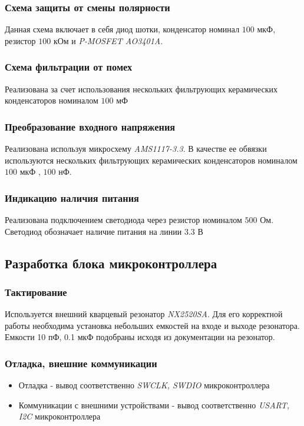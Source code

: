 \subsubsection{Схема защиты от смены полярности}
Данная схема\cite{schemt} включает в себя диод шотки, конденсатор номинал $100$ мкФ, резистор $100$ кОм и \textit{P-MOSFET AO3401A}.

\subsubsection{Схема фильтрации от помех}
Реализована за счет использования нескольких фильтрующих керамических конденсаторов номиналом $100$ мФ

\subsubsection{Преобразование входного напряжения}
Реализована используя микросхему \textit{AMS1117-3.3}. В качестве ее обвязки\cite{ams1117_datasheet} используются нескольких фильтрующих керамических конденсаторов номиналом $100$ мкФ , $100$ нФ.

\subsubsection{Индикацию наличия питания}
Реализована подключением светодиода через резистор номиналом $500$ Ом. Светодиод обозначает наличие питания на линии 3.3 В

\subsection{Разработка блока микроконтроллера}
\subsubsection{Тактирование}
Используется внешний кварцевый резонатор \textit{NX2520SA}. Для его корректной работы необходима установка небольших емкостей на входе и выходе резонатора. Емкости 10 пФ, 0.1 мкФ подобраны исходя из документации на резонатор. 
\subsubsection{Отладка, внешние коммуникации}
\begin{itemize}
    \item Отладка - вывод соответственно \textit{SWCLK, SWDIO} микроконтроллера
    \item Коммуникации с внешними устройствами - вывод соответственно \textit{USART, I2C} микроконтроллера
\end{itemize}


